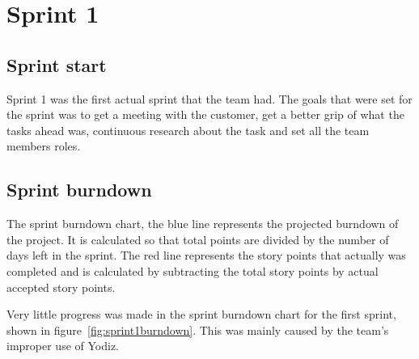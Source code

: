 \section{Sprint 1}

\subsection{Sprint start}

Sprint 1 was the first actual sprint that the team had. The goals that were set for the sprint was to get a meeting with the customer,
get a better grip of what the tasks ahead was, continuous research about the task and set all the team members roles.

\subsection{Sprint burndown}

The sprint burndown chart, the blue line represents the projected burndown of the project. It is calculated so that total points are divided by the number of days left in the sprint. The red line represents the story points that actually was completed and is calculated by subtracting the total story points by actual accepted story points.

Very little progress was made in the sprint burndown chart for the first sprint, shown in figure~\ref{fig:sprint1burndown}. This was mainly caused by the team's improper use of Yodiz.

